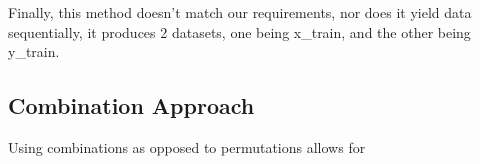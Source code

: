 \documentclass[
	letterpaper, %
	10pt, %
	unnumberedsections, %
	twoside, %
]{LTJournalArticle}
\begin{document}
Finally, this method doesn't match our requirements, nor does it yield data sequentially, it produces 2 datasets, one being x\_train, and the other being y\_train.

\subsection{Combination Approach}

Using combinations as opposed to permutations allows for

% 
% 
% 
% 
% 
\end{document}
